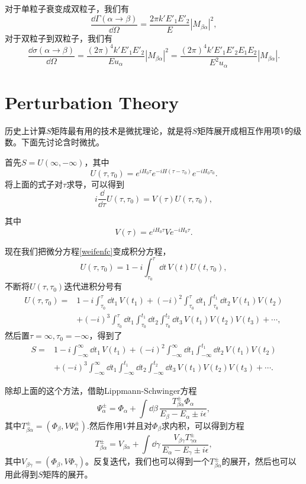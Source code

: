\documentclass[9pt]{extbook}
\begin{document}
对于单粒子衰变成双粒子，我们有
\[
	\frac{\dd \Gamma(\alpha\to \beta)}{\dd \Omega} =\frac{2\pi k'E'_1 E'_2}{E}|M_{\beta\alpha}|^2,
\]
对于双粒子到双粒子，我们有
\[
	\frac{\dd \sigma(\alpha\to \beta)}{\dd \Omega} =\frac{(2\pi)^4 k'E'_1 E'_2}{Eu_\alpha}|M_{\beta\alpha}|^2=\frac{(2\pi)^4 k'E'_1 E'_2 E_1 E_2}{E^2 u_\alpha}|M_{\beta\alpha}|.
\]
\section{Perturbation Theory}
历史上计算$S$矩阵最有用的技术是微扰理论，就是将$S$矩阵展开成相互作用项$V$的级数。下面先讨论含时微扰。

首先$S=U(\infty,-\infty)$，其中
\[
	U(\tau,\tau_0)=e^{iH_0\tau}e^{-iH(\tau-\tau_0)}e^{-iH_0\tau_0}.
\]
将上面的式子对$\tau$求导，可以得到
\begin{equation}
\label{weifenfc}
	i\frac{\dd}{\dd\tau}U(\tau,\tau_0)=V(\tau)U(\tau,\tau_0),
\end{equation}

其中
\[
	V(\tau)=e^{iH_0 \tau}Ve^{-iH_0 \tau}.
\]

现在我们把微分方程\eqref{weifenfc}变成积分方程，
\[
	U(\tau,\tau_0)=1-i\int_{\tau_0}^{\tau}\dd t \, V(t)U(t,\tau_0),
\]
不断将$U(\tau,\tau_0)$迭代进积分号有
\[
\begin{split}
	U(\tau,\tau_0)=&1-i\int_{\tau_0}^{\tau}\dd t_1 \, V(t_1)+(-i)^2\int_{\tau_0}^{\tau}\dd t_1\int_{\tau_0}^{t_1}\dd t_2\, V(t_1)V(t_2)\\
	&+(-i)^3\int_{\tau_0}^{\tau}\dd t_1\int_{\tau_0}^{t_1}\dd t_2\int_{\tau_0}^{t_2}\dd t_3\, V(t_1)V(t_2)V(t_3)+\cdots,
\end{split}
\]
然后置$\tau=\infty,\tau_0=-\infty$，得到了
\begin{equation}
\label{weirao}
\begin{split}
	S=&1-i\int_{-\infty}^{\infty}\dd t_1 \, V(t_1)+(-i)^2\int_{-\infty}^{\infty}\dd t_1\int_{-\infty}^{t_1}\dd t_2\, V(t_1)V(t_2)\\
	&+(-i)^3\int_{-\infty}^{\infty}\dd t_1\int_{-\infty}^{t_1}\dd t_2\int_{-\infty}^{t_2}\dd t_3\, V(t_1)V(t_2)V(t_3)+\cdots.
\end{split}
\end{equation}

除却上面的这个方法，借助Lippmann-Schwinger方程
\[
\Psi_\alpha^\pm=\Phi_\alpha+\int \dd \beta \,\frac{T^\pm_{\beta\alpha}\Phi_\alpha}{E_\beta-E_\alpha\pm i\epsilon},
\]
其中$T^\pm_{\beta\alpha}=(\Phi_\beta,V\Psi_\alpha^\pm)$.然后作用$V$并且对$\Phi_\beta$求内积，可以得到方程
\[
T^\pm_{\beta\alpha}=V_{\beta\alpha}+\int \dd \gamma\, \frac{V_{\beta\gamma}T^\pm_{\gamma\alpha}}{E_\alpha-E_\gamma\pm i\epsilon},
\]
其中$V_{\beta\gamma}=(\Phi_\beta,V\Phi_\gamma)$。反复迭代，我们也可以得到一个$T^\pm_{\beta\alpha}$的展开，然后也可以用此得到$S$矩阵的展开。
\end{document}
